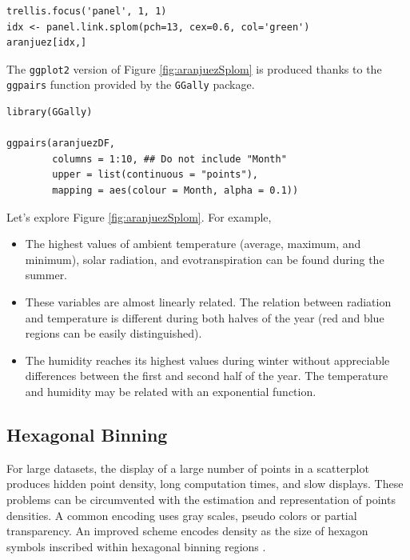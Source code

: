 \documentclass[smallroyalvopaper]{memoir}
\begin{document}

\lstset{language=r,label= ,caption= ,captionpos=b,numbers=none}
\begin{lstlisting}
trellis.focus('panel', 1, 1)
idx <- panel.link.splom(pch=13, cex=0.6, col='green')
aranjuez[idx,]
\end{lstlisting}

The \texttt{ggplot2} version of Figure \ref{fig:aranjuezSplom} is produced
thanks to the \texttt{ggpairs} function provided by the \texttt{GGally} package.


\lstset{language=r,label= ,caption= ,captionpos=b,numbers=none}
\begin{lstlisting}
library(GGally)

ggpairs(aranjuezDF,
        columns = 1:10, ## Do not include "Month"
        upper = list(continuous = "points"),
        mapping = aes(colour = Month, alpha = 0.1))
\end{lstlisting}

Let's explore Figure \ref{fig:aranjuezSplom}. For example,
\begin{itemize}
\item The highest values of ambient temperature (average, maximum, and
minimum), solar radiation, and evotranspiration can be found during
the summer.
\item These variables are almost linearly related. The relation between
radiation and temperature is different during both halves of the
year (red and blue regions can be easily distinguished).
\item The humidity reaches its highest values during winter without
appreciable differences between the first and second half of the
year. The temperature and humidity may be related with an
exponential function.
\end{itemize}

\subsection{Hexagonal Binning \label{SEC:hexbin}}
\label{sec:org762c9e4}

For large datasets, the display of a large number of points in a
scatterplot produces hidden point density, long computation times,
and slow displays. These problems can be circumvented with the
estimation and representation of points densities.  A common
encoding uses gray scales, pseudo colors or partial
transparency. An improved scheme encodes density as the size of
hexagon symbols inscribed within hexagonal binning regions
\cite{Carr.Littlefield.ea1987}.
\end{document}
